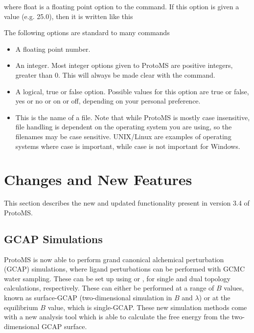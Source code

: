 \documentclass[letterpaper,10pt,english]{sphinxmanual}
\begin{document}
where float is a floating point option to the command. If this option is given a value (e.g. 25.0), then it is written like this

%
\begin{sphinxVerbatim}[commandchars=\\\{\}]
 
\end{sphinxVerbatim}

The following options are standard to many commands
\begin{itemize}
\item {} 
 A floating point number.

\item {} 
 An integer. Most integer options given to ProtoMS are positive integers, greater than 0. This will always be made clear with the command.

\item {} 
 A logical, true or false option. Possible values for this option are true or false, yes or no or on or off, depending on your personal preference.

\item {} 
 This is the name of a file. Note that while ProtoMS is mostly case insensitive, file handling is dependent on the operating system you are using, so the filenames may be case sensitive. UNIX/Linux are examples of operating systems where case is important, while case is not important for Windows.

\end{itemize}


\chapter{Changes and New Features}
\label{\detokenize{changelog:changes-and-new-features}}\label{\detokenize{changelog::doc}}
This section describes the new and updated functionality present in version 3.4 of ProtoMS.


\section{GCAP Simulations}
\label{\detokenize{changelog:gcap-simulations}}
ProtoMS is now able to perform grand canonical alchemical perturbation (GCAP) simulations, where ligand perturbations can be performed with GCMC water sampling. These can be set up using  or , for single and dual topology calculations, respectively. These can either be performed at a range of \(B\) values, known as surface-GCAP (two-dimensional simulation in \(B\) and \(\lambda\)) or at the equilibrium \(B\) value, which is single-GCAP. These new simulation methods come with a new analysis tool  which is able to calculate the free energy from the two-dimensional GCAP surface.
\end{document}
